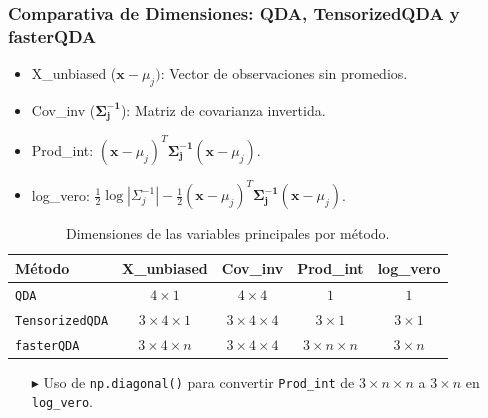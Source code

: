 \documentclass{beamer}
\begin{document}
\begin{frame}
  \frametitle{Comparativa de Dimensiones: QDA, TensorizedQDA y fasterQDA}

  \begin{itemize}
    \item X\_unbiased (\(\mathbf{x} - \mu_j)\): Vector de observaciones sin promedios.
    \item Cov\_inv (\(\mathbf{\Sigma_j^{-1}}\)): Matriz de covarianza invertida.
    \item Prod\_int: \((\mathbf{x} - \mu_j)^T \mathbf{\Sigma_j^{-1}} (\mathbf{x} - \mu_j)\).
    \item log\_vero: \( \frac{1}{2} \log{\left|\Sigma_j^{-1}\right|} - \frac{1}{2} (\mathbf{x} - \mu_j)^T \mathbf{\Sigma_j^{-1}} (\mathbf{x} - \mu_j)\).


  \end{itemize}

  \begin{table}[h!]
    \centering
    \begin{tabular}{@{}lcccc@{}}
      \toprule
      \textbf{Método}     		  & X\_unbiased 				 	&Cov\_inv 				 & Prod\_int				& 	 log\_vero		 	 \\ 
      \midrule
      \texttt{QDA}         		 & \(4 \times 1\)              		    & \(4 \times 4\)           		 & \(1\)            			& 	 \cellcolor{yellow}\(1\)				 \\ 
      \texttt{TensorizedQDA}	 & \(3 \times 4 \times 1\)           & \(3 \times 4 \times 4\)     & \(3 \times 1 \)		 	& 	\cellcolor{yellow} \(3 \times 1\)		\\ 
      \texttt{fasterQDA}  	  	 & \(3 \times 4 \times n\)           & \(3 \times 4 \times 4\)     & \(3 \times n \times n\) & 	\cellcolor{yellow}\(3 \times n \) 		\\ 
      \bottomrule
    \end{tabular}
    \caption{Dimensiones de las variables principales por método.}
  \end{table}

  \begin{itemize}
    \item[$\blacktriangleright$] Uso de \texttt{np.diagonal()} para convertir \texttt{Prod\_int} de \(3 \times n \times n\) a \(3 \times n\) en \texttt{log\_vero}.
  \end{itemize}

\end{frame}
\end{document}
